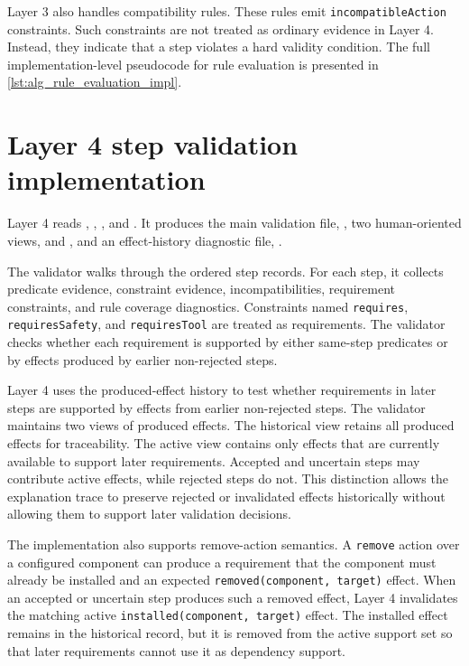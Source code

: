 Layer 3 also handles compatibility rules. These rules emit \texttt{incompatibleAction} constraints. Such constraints are not treated as ordinary evidence in Layer 4. Instead, they indicate that a step violates a hard validity condition. The full implementation-level pseudocode for rule evaluation is presented in \cref{lst:alg_rule_evaluation_impl}. 

\section{Layer 4 step validation implementation}
\label{sec:implementation-layer4}

Layer 4 reads , , , and . It produces the main validation file, , two human-oriented views,  and , and an effect-history diagnostic file, .

The validator walks through the ordered step records. For each step, it collects predicate evidence, constraint evidence, incompatibilities, requirement constraints, and rule coverage diagnostics. Constraints named \texttt{requires}, \texttt{requiresSafety}, and \texttt{requiresTool} are treated as requirements. The validator checks whether each requirement is supported by either same-step predicates or by effects produced by earlier non-rejected steps.

Layer 4 uses the produced-effect history to test whether requirements in later steps are supported by effects from earlier non-rejected steps. The validator maintains two views of produced effects. The historical view retains all produced effects for traceability. The active view contains only effects that are currently available to support later requirements. Accepted and uncertain steps may contribute active effects, while rejected steps do not. This distinction allows the explanation trace to preserve rejected or invalidated effects historically without allowing them to support later validation decisions.

The implementation also supports remove-action semantics. A \texttt{remove} action over a configured component can produce a requirement that the component must already be installed and an expected \texttt{removed(component, target)} effect. When an accepted or uncertain step produces such a removed effect, Layer 4 invalidates the matching active \texttt{installed(component, target)} effect. The installed effect remains in the historical record, but it is removed from the active support set so that later requirements cannot use it as dependency support.

